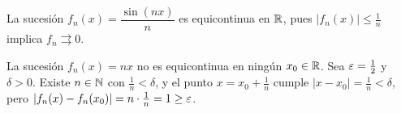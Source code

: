 \begin{eg}
  La sucesión \(f_n(x) = \dfrac{\sin(nx)}{n}\) es equicontinua en \(\mathbb{R}\), pues \(|f_n(x)| \leq \frac{1}{n}\) implica \(f_n \rightrightarrows 0\).
\end{eg}

\begin{eg}
  La sucesión \(f_n(x) = nx\) no es equicontinua en ningún \(x_0 \in \mathbb{R}\). Sea \(\varepsilon = \frac{1}{2}\) y \(\delta > 0\). Existe \(n \in \mathbb{N}\) con \(\frac{1}{n} < \delta\), y el punto \(x = x_0 + \frac{1}{n}\) cumple \(|x - x_0| = \frac{1}{n} < \delta\), pero \(|f_n(x) - f_n(x_0)| = n \cdot \frac{1}{n} = 1 \geq \varepsilon\).
\end{eg}
